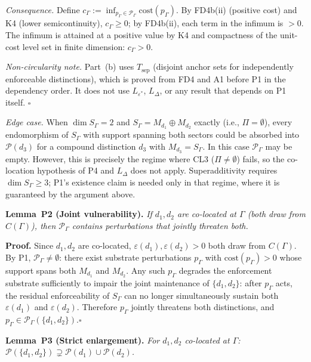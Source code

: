 \documentclass[11pt]{article}
\theoremstyle{remark}
\begin{document}
\textit{Consequence.}  Define $c_\Gamma := \inf_{p_\Gamma \in \mathcal{P}_\Gamma} \mathrm{cost}(p_\Gamma)$.  By FD4b(ii) (positive cost) and K4 (lower semicontinuity), $c_\Gamma \ge 0$; by FD4b(ii), each term in the infimum is $> 0$.  The infimum is attained at a positive value by K4 and compactness of the unit-cost level set in finite dimension: $c_\Gamma > 0$.

\textit{Non-circularity note.}  Part~(b) uses $T_{\mathrm{sep}}$ (disjoint anchor sets for independently enforceable distinctions), which is proved from FD4 and A1 before P1 in the dependency order.  It does not use $L_{\varepsilon^*}$, $L_\Delta$, or any result that depends on P1 itself.  \hfill$\square$

\smallskip\noindent\textit{Edge case.}  When $\dim S_\Gamma = 2$ and $S_\Gamma = M_{d_1} \oplus M_{d_2}$ exactly (i.e., $\Pi = \emptyset$), every endomorphism of $S_\Gamma$ with support spanning both sectors could be absorbed into $\mathcal{P}(d_3)$ for a compound distinction $d_3$ with $M_{d_3} = S_\Gamma$.  In this case $\mathcal{P}_\Gamma$ may be empty.  However, this is precisely the regime where CL3 ($\Pi \ne \emptyset$) fails, so the co-location hypothesis of P4 and $L_\Delta$ does not apply.  Superadditivity requires $\dim S_\Gamma \ge 3$; P1's existence claim is needed only in that regime, where it is guaranteed by the argument above.

\smallskip\noindent\textbf{Lemma~P2 (Joint vulnerability).}
\emph{If $d_1, d_2$ are co-located at $\Gamma$ (both draw from $C(\Gamma)$), then $\mathcal{P}_\Gamma$ contains perturbations that jointly threaten both.}

\smallskip\noindent\textbf{Proof.}
Since $d_1, d_2$ are co-located, $\varepsilon(d_1), \varepsilon(d_2) > 0$ both draw from $C(\Gamma)$.  By P1, $\mathcal{P}_\Gamma \ne \emptyset$: there exist substrate perturbations $p_\Gamma$ with $\mathrm{cost}(p_\Gamma) > 0$ whose support spans both $M_{d_1}$ and $M_{d_2}$.  Any such $p_\Gamma$ degrades the enforcement substrate sufficiently to impair the joint maintenance of $\{d_1, d_2\}$: after $p_\Gamma$ acts, the residual enforceability of $S_\Gamma$ can no longer simultaneously sustain both $\varepsilon(d_1)$ and $\varepsilon(d_2)$.  Therefore $p_\Gamma$ jointly threatens both distinctions, and $p_\Gamma \in \mathcal{P}_\Gamma(\{d_1,d_2\})$.\hfill$\square$

\smallskip\noindent\textbf{Lemma~P3 (Strict enlargement).}
\emph{For $d_1, d_2$ co-located at $\Gamma$: $\mathcal{P}(\{d_1,d_2\}) \supsetneq \mathcal{P}(d_1) \cup \mathcal{P}(d_2)$.}
\end{document}
